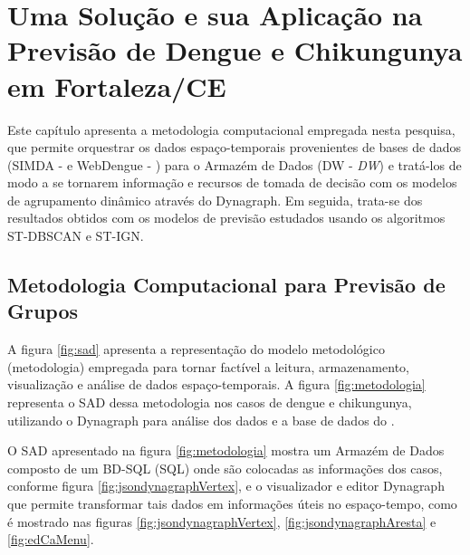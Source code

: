 \chapter{Uma Solução e sua Aplicação na Previsão de Dengue e Chikungunya em Fortaleza/CE}
\label{chap:avaliacao}

Este capítulo apresenta a metodologia computacional empregada nesta pesquisa, que permite orquestrar os dados espaço-temporais provenientes de bases de dados (\acrshort{SIMDA} - \cite{simda} e WebDengue - \cite{webdengue2011}) para o Armazém de Dados (\acrshort{DW} - \textit{\acrlong{DW}}) e tratá-los de modo a se tornarem informação e recursos de tomada de decisão com os modelos de agrupamento dinâmico através do Dynagraph. Em seguida, trata-se dos resultados obtidos com os modelos de previsão estudados usando os algoritmos \acrshort{ST-DBSCAN} e \acrshort{ST-IGN}.

\section{Metodologia Computacional para Previsão de Grupos}

A figura \ref{fig:sad} apresenta a representação do modelo metodológico (metodologia) empregada para tornar factível a leitura, armazenamento, visualização e análise de dados espaço-temporais. A figura \ref{fig:metodologia} representa o \acrshort{SAD} dessa metodologia nos casos de dengue e chikungunya, utilizando o Dynagraph para análise dos dados e a base de dados do .

\begin{figure}[!ht]
	\centering	
\end{figure}
\FloatBarrier

O SAD apresentado na figura \ref{fig:metodologia} mostra um Armazém de Dados composto de um \acrfull{BD-SQL} (\acrfull{SQL}) onde são colocadas as informações dos casos, conforme figura \ref{fig:jsondynagraphVertex}, e o visualizador e editor Dynagraph que permite transformar tais dados em informações úteis no espaço-tempo, como é mostrado nas figuras \ref{fig:jsondynagraphVertex}, \ref{fig:jsondynagraphAresta} e \ref{fig:edCaMenu}.

